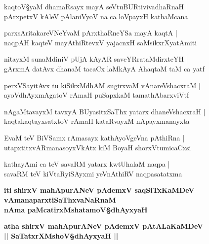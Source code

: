 \begin{shloka}
kaqtoV\S yaM dhamaRsayx mayA seVtuBURtivivadhaRnaH |\\
pArxpetxV kAleV pAlaniVyoV na ca loVpayxH kathaMcana
\end{shloka}

\begin{shloka}
parxsAritakareVNeYvaM pArxthaRneYSa mayA kaqtA |\\
naqpAH kaqteV mayAthiRtevxV yajacnxH saMsikxrXyatAmiti
\end{shloka}

\begin{shloka}
nitayxM sunaMdiniV pUjA kAyAR saveYRrataMdirxteYH |\\
gArxmA\R{} datAvx dhanaM tacaCx laMkAyA AhaqtaM taM ca yatf 
\end{shloka}

\begin{shloka}
perxVSayitAvx tu  kiSikxMdhAM sugirxvaM vAnareVshacxraM |\\
ayoVdhAyxmAgatoV rAmaH puSapxkaM tamathAbarxviVtf 
\end{shloka}

\begin{shloka}
nAgaMtavayxM tavxyA BUyasitxSaThx yatarx dhaneVshacxraH |\\
kaqtakaqtayxsatxtoV rAmaH kataRvayxM nApayxmanayxta 
\end{shloka}

\begin{shloka}
EvaM teV BiVSamx rAmasayx kathAyoVgeVna pAthiRna |\\
utapxtitxvARmanasoyxVkAtx kiM BoyaH shorxVtumicaCxsi
\end{shloka}

\begin{shloka}
kathayAmi ca teV savaRM yatarx kwtUhalaM naqpa |\\
savaRM teV kiVtaRyiSAyxmi yeVnAthiRV naqpasatatxma 
\end{shloka}

\begin{center}
\textbf{iti shirxV mahApurANeV pAdemxV saqSiTxKaMDeV vAmanaparxtiSaThxvaNaRnaM}\\
\textbf{nAma paMcatirxMshatamoV\S dhAyxyaH }
\end{center}

\setcounter{shloka}{0}

\begin{center}
\textbf{\large atha shirxV mahApurANeV pAdemxV pAtALaKaMDeV }\\
\textbf{\Large || SaTatxrXMshoV\S dhAyxyaH ||}
\end{center}

